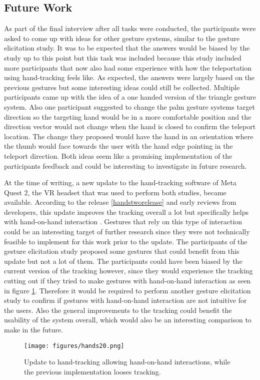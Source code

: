 \subsection{Future Work}

As part of the final interview after all tasks were conducted, the participants were asked to come up with ideas for other gesture systems, similar to the gesture elicitation study. It was to be expected that the answers would be biased by the study up to this point but this task was included because this study included more participants that now also had some experience with how the teleportation using hand-tracking feels like. As expected, the answers were largely based on the previous gestures but some interesting ideas could still be collected. Multiple participants came up with the idea of a one handed version of the triangle gesture system. Also one participant suggested to change the palm gesture systems target direction so the targeting hand would be in a more comfortable position and the direction vector would not change when the hand is closed to confirm the teleport location. The change they proposed would have the hand in an orientation where the thumb would face towards the user with the hand edge pointing in the teleport direction. Both ideas seem like a promising implementation of the participants feedback and could be interesting to investigate in future research.

At the time of writing, a new update to the hand-tracking software of Meta Quest 2, the VR headset that was used to perform both studies, became available. According to the release  \ref{handstworelease} and early reviews from developers, this update improves the tracking overall a lot but specifically helps with hand-on-hand interaction \cite{handstwoupdate}. Gestures that rely on this type of interaction could be an interesting target of further research since they were not technically feasible to implement for this work prior to the update. The participants of the gesture elicitation study proposed some gestures that could benefit from this update but not a lot of them. The participants could have been biased  by the current version of the tracking however, since they would experience the tracking cutting out if they tried to make gestures with hand-on-hand interaction as seen in figure \ref{fig:hands20}. Therefore it would be required to perform another gesture elicitation study to confirm if gestures with hand-on-hand interaction are not intuitive for the users. Also the general improvements to the tracking could benefit the usability of the system overall, which would also be an interesting comparison to make in the future. 

\begin{figure}[!ht]
    \centering
    \texttt{[image: figures/hands20.png]}
    \caption{Update to hand-tracking allowing hand-on-hand interactions, while the previous implementation looses tracking.}
    \label{fig:hands20}
\end{figure}


